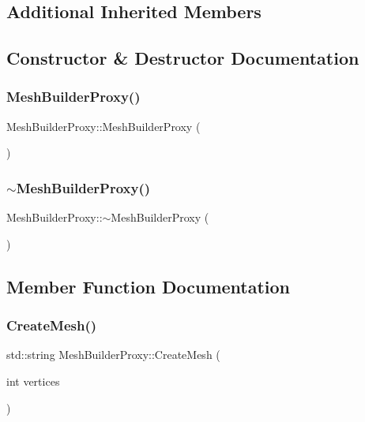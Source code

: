 \subsection*{Additional Inherited Members}


\subsection{Constructor \& Destructor Documentation}
\mbox{\label{class_mesh_builder_proxy_a4401f9a56170b3d4e5efca1f4d689be0}} 
\subsubsection{\texorpdfstring{MeshBuilderProxy()}{MeshBuilderProxy()}}
{\footnotesize\ttfamily Mesh\+Builder\+Proxy\+::\+Mesh\+Builder\+Proxy (\begin{DoxyParamCaption}{ }\end{DoxyParamCaption})}

\mbox{\label{class_mesh_builder_proxy_abc3f41500a0dd22d857ad9f380969fd6}} 
\subsubsection{\texorpdfstring{$\sim$MeshBuilderProxy()}{~MeshBuilderProxy()}}
{\footnotesize\ttfamily Mesh\+Builder\+Proxy\+::$\sim$\+Mesh\+Builder\+Proxy (\begin{DoxyParamCaption}{ }\end{DoxyParamCaption})}



\subsection{Member Function Documentation}
\mbox{\label{class_mesh_builder_proxy_aeef3c361967a22015c6bd314e3b473e7}} 
\subsubsection{\texorpdfstring{CreateMesh()}{CreateMesh()}}
{\footnotesize\ttfamily std\+::string Mesh\+Builder\+Proxy\+::\+Create\+Mesh (\begin{DoxyParamCaption}\item[{int}]{vertices }\end{DoxyParamCaption})\hspace{0.3cm}{\ttfamily [virtual]}}



